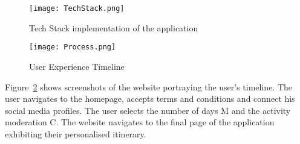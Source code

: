 \begin{figure}[h]
\centering
\texttt{[image: TechStack.png]}
\caption{Tech Stack implementation of the application} \label{TechStack}
\end{figure}

\begin{figure}[h]
\centering
\texttt{[image: Process.png]}
\caption{User Experience Timeline}
\label{Timeline}
\end{figure}

Figure~\ref{Timeline} shows screenshots of the website portraying
the user's timeline.  The user navigates to the
homepage, accepts terms and conditions and connect his
social media profiles.  The user selects the number of
days M and the activity moderation C.  The website
navigates to the final page of the application
exhibiting their personalised itinerary. 
